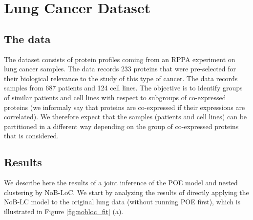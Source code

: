 \section{Lung Cancer Dataset}

\subsection{The data}

The dataset consists of protein profiles coming from an RPPA experiment on lung cancer samples. The data records 233 proteins  that were pre-selected for their biological relevance to the study of this type of cancer. The data records samples from 687 patients and 124 cell lines. The objective is to identify groups of similar patients and cell lines with respect to subgroups of co-expressed proteins (we informaly say that proteins are co-expressed if their expressions are correlated). We therefore expect that the samples (patients and cell lines) can be partitioned in a different way depending on the group of co-expressed proteins that is considered. 

\subsection{Results}

We describe here the results of a joint inference of the POE model and nested clustering by NoB-LoC. We start by analyzing the results of directly applying the NoB-LC model to the original lung data (without running POE first), which is illustrated in Figure \ref{fig:nobloc_fit} (a).

